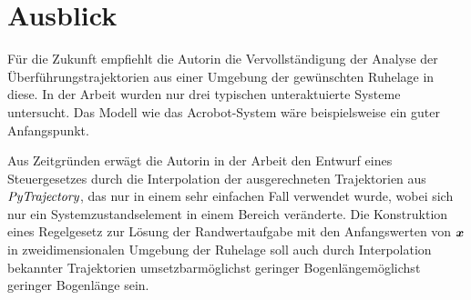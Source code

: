 \section{Ausblick}
\label{Ausblick}
Für die Zukunft empfiehlt die Autorin die Vervollständigung der Analyse der Überführungstrajektorien aus einer Umgebung der gewünschten Ruhelage in diese. In der Arbeit wurden nur drei typischen unteraktuierte Systeme untersucht. Das Modell wie das Acrobot-System \cite{spong1995swing} wäre beispielsweise ein guter Anfangspunkt.

Aus Zeitgründen erwägt die Autorin in der Arbeit den Entwurf eines Steuergesetzes durch die Interpolation der ausgerechneten Trajektorien aus $\emph{PyTrajectory}$, das nur in einem sehr einfachen Fall verwendet wurde, wobei sich nur ein Systemzustandselement in einem Bereich veränderte. Die Konstruktion eines Regelgesetz zur Lösung der Randwertaufgabe mit den Anfangswerten von $\boldsymbol x$ in zweidimensionalen Umgebung der Ruhelage soll auch durch Interpolation bekannter Trajektorien umsetzbarmöglichst geringer Bogenlängemöglichst geringer Bogenlänge sein. 
